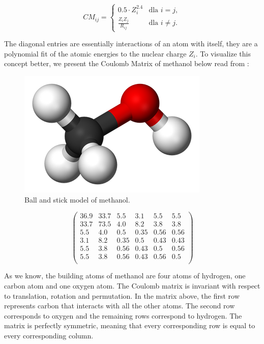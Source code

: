 \documentclass[a4paper,oneside,openright,11pt]{book}
\begin{document}
\begin{equation}
CM_{ij} =
\begin{cases} 
0.5 \cdot Z_{i}^{2.4} & \text{dla } i = j, \\

\frac{Z_{i} Z_{j}}{R_{ij}}  & \text{dla } i \neq j. 
\end{cases}
\end{equation}

\noindent
The diagonal entries are essentially interactions of an atom with itself, they are a polynomial fit of the atomic energies to the nuclear charge $Z_i$. To visualize this concept better, we present the Coulomb Matrix of methanol below read from \cite{CMy}:

\begin{figure}[h]
\centering
\includegraphics[scale=0.5]{DocumentFigures/Figures/metan.png}
\caption{Ball and stick model of methanol.\cite{CMy}}
\end{figure}


\begin{equation}
\begin{pmatrix}
36.9 & 33.7 & 5.5 & 3.1 & 5.5 & 5.5\\
33.7 & 73.5 & 4.0 & 8.2 & 3.8 & 3.8\\
5.5 & 4.0 & 0.5 & 0.35 & 0.56 & 0.56\\
3.1 & 8.2 & 0.35 & 0.5 & 0.43 & 0.43\\
5.5 & 3.8 & 0.56 & 0.43 & 0.5 & 0.56\\
5.5 & 3.8 & 0.56 & 0.43 & 0.56 & 0.5\\
\end{pmatrix}
\end{equation}

As we know, the building atoms of methanol are four atoms of hydrogen, one carbon atom and one oxygen atom. The Coulomb matrix is invariant with respect to translation, rotation and permutation. In the matrix above, the first row represents carbon that interacts with all the other atoms. The second row corresponds to oxygen and the remaining rows correspond to hydrogen. The matrix is perfectly symmetric, meaning that every corresponding row is equal to every corresponding column.
\end{document}
